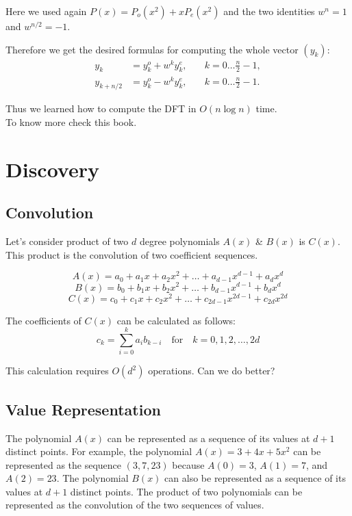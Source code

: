 \documentclass[28]{report}
\begin{document}
Here we used again $P(x) = P_o(x^2) + x P_e(x^2)$ and the two identities $w^n = 1$ and $w^{n/2} = -1$.

Therefore we get the desired formulas for computing the whole vector $(y_k)$:
\begin{align*} y_k &= y_k^o + w^k y_k^e, &\quad k = 0 \dots \frac{n}{2} - 1, \\ y_{k+n/2} &= y_k^o - w^k y_k^e, &\quad k = 0 \dots \frac{n}{2} - 1. \end{align*}

Thus we learned how to compute the DFT in $O(n \log n)$ time.\\
To know more check this\cite{fftbook1} book.

\chapter{Discovery}


\section{Convolution}
Let's consider product of two \(d\) degree polynomials \(A(x)\) \& \(B(x)\) is \(C(x)\). This product is the convolution of two coefficient sequences.

	$$A(x) = a_0 + a_1x + a_2x^2 + \ldots + a_{d-1}x^{d-1} + a_dx^d $$
	$$B(x) = b_0 + b_1x + b_2x^2 + \ldots + b_{d-1}x^{d-1} + b_dx^d $$
	$$C(x) = c_0 + c_1x + c_2x^2 + \ldots + c_{2d-1}x^{2d-1} + c_{2d}x^{2d}$$

The coefficients of \(C(x)\) can be calculated as follows:
$$ c_k = \sum_{i=0}^{k} a_ib_{k-i} \quad \text{for} \quad k = 0, 1, 2, \ldots, 2d$$

This calculation requires \(O(d^2)\) operations. Can we do better?


\section{Value  Representation}

The polynomial \(A(x)\) can be represented as a sequence of its values at \(d+1\) distinct points. For example, the polynomial \(A(x) = 3 + 4x + 5x^2\) can be represented as the sequence \((3, 7, 23)\) because \(A(0) = 3\), \(A(1) = 7\), and \(A(2) = 23\). The polynomial \(B(x)\) can also be represented as a sequence of its values at \(d+1\) distinct points. The product of two polynomials can be represented as the convolution of the two sequences of values.
\end{document}
